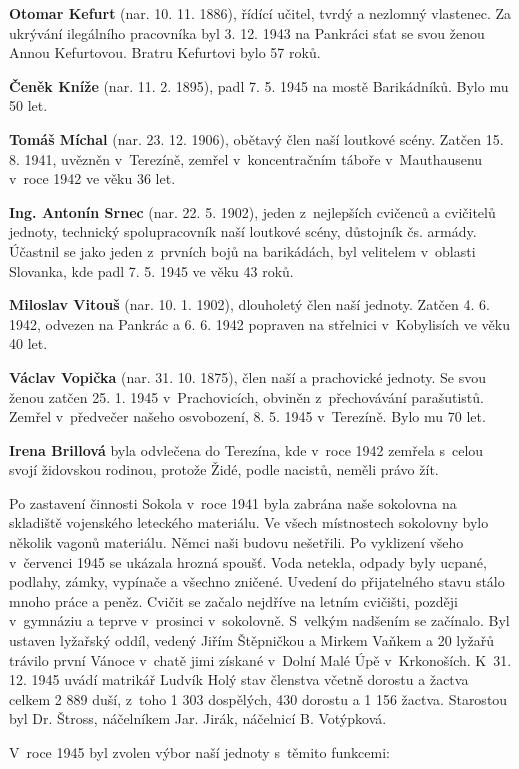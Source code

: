 \documentclass[a5paper, 11pt, twoside]{article}
\begin{document}
\textbf{Otomar Kefurt} (nar. 10. 11. 1886), řídící učitel, tvrdý a
nezlomný vlastenec. Za ukrývání ilegálního pracovníka byl 3. 12. 1943 na
Pankráci sťat se svou ženou Annou Kefurtovou. Bratru Kefurtovi bylo 57
roků.

\textbf{Čeněk Kníže} (nar. 11. 2. 1895), padl 7. 5. 1945 na mostě
Barikádníků. Bylo mu 50 let.

\textbf{Tomáš Míchal} (nar. 23. 12. 1906), obětavý člen naší loutkové
scény. Zatčen 15. 8. 1941, uvězněn v~Terezíně, zemřel v~koncentračním
táboře v~Mauthausenu v~roce 1942 ve věku 36 let.

\textbf{Ing. Antonín Srnec} (nar. 22. 5. 1902), jeden z~nejlepších
cvičenců a cvičitelů jednoty, technický spolupracovník naší loutkové
scény, důstojník čs. armády. Účastnil se jako jeden z~prvních bojů na
barikádách, byl velitelem v~oblasti Slovanka, kde padl 7. 5. 1945 ve
věku 43 roků.

\textbf{Miloslav Vitouš} (nar. 10. 1. 1902), dlouholetý člen naší
jednoty. Zatčen 4. 6. 1942, odvezen na Pankrác a 6. 6. 1942 popraven na
střelnici v~Kobylisích ve věku 40 let.

\textbf{Václav Vopička} (nar. 31. 10. 1875), člen naší a prachovické
jednoty. Se svou ženou zatčen 25. 1. 1945 v~Prachovicích, obviněn
z~přechovávání parašutistů. Zemřel v~předvečer našeho osvobození, 8. 5.
1945 v~Terezíně. Bylo mu 70 let.

\textbf{Irena Brillová} byla odvlečena do Terezína, kde v~roce 1942
zemřela s~celou svojí židovskou rodinou, protože Židé, podle nacistů,
neměli právo žít.

Po zastavení činnosti Sokola v~roce 1941 byla zabrána naše sokolovna na
skladiště vojenského leteckého materiálu. Ve všech místnostech sokolovny
bylo několik vagonů materiálu. Němci naši budovu nešetřili. Po vyklizení
všeho v~červenci 1945 se ukázala hrozná spoušť. Voda netekla, odpady
byly ucpané, podlahy, zámky, vypínače a všechno zničené. Uvedení do
přijatelného stavu stálo mnoho práce a peněz. Cvičit se začalo nejdříve
na letním cvičišti, později v~gymnáziu a teprve v~prosinci v~sokolovně.
S~velkým nadšením se začínalo. Byl ustaven lyžařský oddíl, vedený Jiřím
Štěpničkou a Mirkem Vaňkem a 20 lyžařů trávilo první Vánoce v~chatě jimi
získané v~Dolní Malé Úpě v~Krkonoších. K~31. 12. 1945 uvádí matrikář
Ludvík Holý stav členstva včetně dorostu a žactva celkem 2 889 duší,
z~toho 1 303 dospělých, 430 dorostu a 1 156 žactva. Starostou byl Dr.
Štross, náčelníkem Jar. Jirák, náčelnicí B. Votýpková.

V~roce 1945 byl zvolen výbor naší jednoty s~těmito funkcemi:
\end{document}
